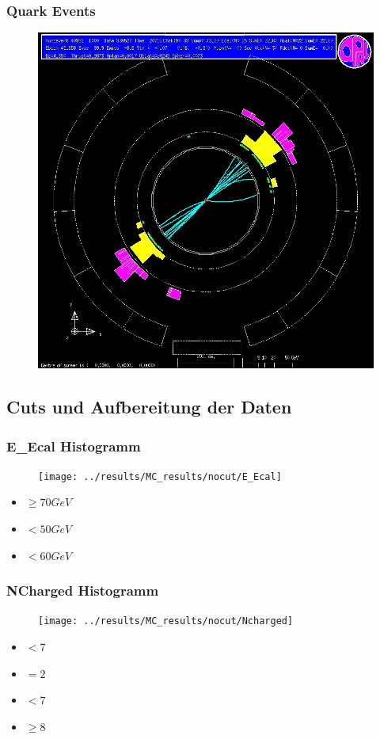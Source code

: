 \begin{frame}
	\frametitle{Quark Events}
	\begin{figure}
		\centering
		\includegraphics[width=0.63\linewidth]{graphics/quarkopal}
	\end{figure}
\end{frame}
\subsection{Cuts und Aufbereitung der Daten}
\begin{frame}
	\frametitle{E\_Ecal Histogramm}
	\begin{figure}
		\centering
		\texttt{[image: ../results/MC\_results/nocut/E\_Ecal]}
	\end{figure}
	\begin{center}
		\begin{itemize}
			\item {} $\ge 70 \unit{GeV}$
			\item {} $< 50 \unit{GeV}$
			\item {} $< 60 \unit{GeV}$
		\end{itemize}
	\end{center}
\end{frame}

\begin{frame}
	\frametitle{NCharged Histogramm}
	\begin{figure}
		\centering
		\texttt{[image: ../results/MC\_results/nocut/Ncharged]}
	\end{figure}
	\begin{center}
		\begin{itemize}
			\item {} $<7$
			\item {} $=2$
			\item {} $<7$
			\item {} $\ge8$
		\end{itemize}
	\end{center}
\end{frame}

